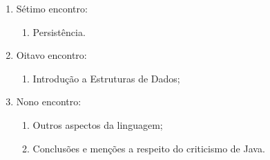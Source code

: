 \documentclass{article}
\begin{document}
\begin{enumerate}[label= (\alph*)]
\begin{samepage}
\begin{enumerate}
            \end{enumerate}
        \end{samepage}
    \item Sétimo encontro:
        \begin{samepage}
            \begin{enumerate}
                \item Persistência.
            \end{enumerate}
        \end{samepage}
    \item Oitavo encontro:
        \begin{samepage}
            \begin{enumerate}
                \item Introdução a Estruturas de Dados;
            \end{enumerate}
        \end{samepage}
    \item Nono encontro:
        \begin{samepage}
            \begin{enumerate}
                \item Outros aspectos da linguagem;
                \item Conclusões e menções a respeito do criticismo de Java.
            \end{enumerate}
        \end{samepage}
\end{enumerate}

\nocite{*}


\end{document}
